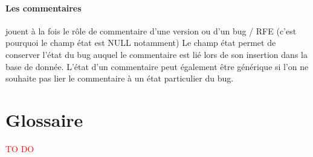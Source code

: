 \documentclass{article}[12pt]
\begin{document}
\paragraph{Les commentaires} jouent à la fois le rôle de commentaire d'une version ou d'un bug / RFE (c'est pourquoi le champ état est NULL notamment) Le champ \og état \fg permet de conserver l'état du bug auquel le commentaire est lié lors de son insertion dans la base de donnée.
\newline
\newline
L'état d'un commentaire peut également être générique si l'on ne souhaite pas lier le commentaire à un état particulier du bug.
\section{Glossaire}


 \textcolor{red}{TO DO}
\end{document}
